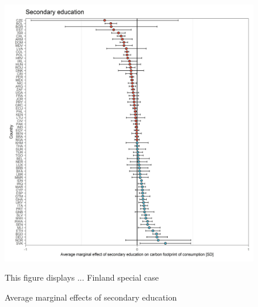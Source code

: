 \documentclass[12pt, a4paper]{article}
\newenvironment{subcaption}
{\strut
\vspace{-5pt}
\begin{minipage}[b]{0.9\textwidth}
  \hspace*{-\parindent}
  \footnotesize}
 {\end{minipage}}
\begin{document}
\begin{figure}[ht!]
  \centering
 \caption{Average marginal effects of secondary education} \label{fig:D10_sec_edu}
  \includegraphics{Analysis_OLS_ME_Carbon_Footprint/AME_OLS_FP_secondary_education}
  \begin{subcaption}
    This figure displays ... Finland special case
  \end{subcaption}

\end{figure}

\clearpage
\end{document}
